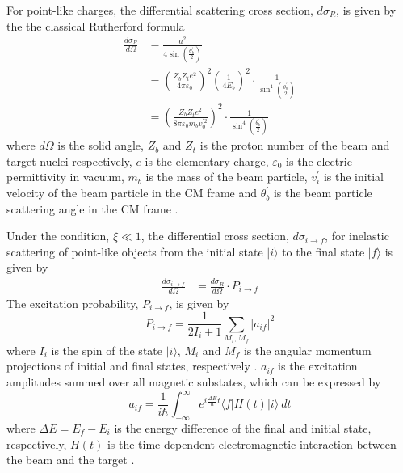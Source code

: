 \documentclass[twoside,english]{uiofysmaster/uiofysmaster}
\begin{document}
For point-like charges, the differential scattering cross section, $d\sigma_R$, is given by the the classical Rutherford formula
\begin{align}
	\frac{d\sigma_R}{d\Omega} 
	&= \frac{a^2}{4 \sin \left( \tfrac{\theta_b^{'}}{2} \right)} \nonumber \\
	&= \left( \frac{Z_b Z_t e^2}{4\pi \varepsilon_0}  \right)^2 \left( \frac{1}{4 E_b}  \right)^2 \cdot \frac{1}{\sin^4 \left( \frac{\theta_b^{'}}{2} \right)} \nonumber \\	
	&= \left( \frac{Z_b Z_t e^2}{8 \pi \varepsilon_0 m_b v_0^{' 2}} \right)^2 \cdot \frac{1}{\sin^4 \left( \frac{\theta_b^{'}}{2} \right)} 
\end{align}
where $d\Omega$ is the solid angle, $Z_b$ and $Z_t$ is the proton number of the beam and target nuclei respectively, $e$ is the elementary charge, $\varepsilon_0$ is the electric permittivity in vacuum, $m_b$ is the mass of the beam particle, $v_i^{'}$ is the initial velocity of the beam particle in the CM frame and $\theta_b^{'}$ is the beam particle scattering angle in the CM frame \cite{Klintefjord, Krane, EE-Coulex}.

Under the condition, $\xi \ll 1$, the differential cross section, $d\sigma_{i \rightarrow f}$, for inelastic scattering of point-like objects from the initial state $|i\rangle$ to the final state $|f\rangle$ is given by 
\begin{align}
	\frac{d\sigma_{i \rightarrow f}}{d\Omega} 
	&= \frac{d\sigma_R}{d\Omega} \cdot P_{i \rightarrow f} 
\end{align}
The excitation probability, $P_{i \rightarrow f}$, is given by
\begin{equation}
	P_{i \rightarrow f} = \frac{1}{2I_i + 1} \sum_{M_i, M_f} | a_{if} |^2
\end{equation}
where $I_i$ is the spin of the state $|i\rangle$, $M_i$ and $M_f$ is the angular momentum projections of initial and final states, respectively \cite{EE-Coulex, NaR}.
$a_{if}$ is the excitation amplitudes summed over all magnetic substates, which can be expressed by
\begin{equation}
	a_{if} = \frac{1}{i\hbar} \int_{-\infty}^{\infty} e^{i \frac{\Delta E}{\hbar} t} \langle f | H(t) | i \rangle ~dt
\end{equation}
where $\Delta E = E_f - E_i$ is the energy difference of the final and initial state, respectively, $H(t)$ is the time-dependent electromagnetic interaction between the beam and the target \cite{Klintefjord, Niedermaier, NaR}.
\end{document}
